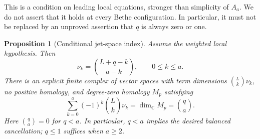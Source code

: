 \documentclass[11pt]{article}
\newtheorem{proposition}{Proposition}[section]
\theoremstyle{definition}
\newcommand{\C}{\mathbb C}
\begin{document}
This is a condition on leading local equations, stronger than simplicity
of $A_a$. We do not assert that it holds at every Bethe configuration.
In particular, it must not be replaced by an unproved assertion that
$q$ is always zero or one.

\begin{proposition}[Conditional jet-space index]\label{prop:jet-koszul-index}
Assume the weighted local hypothesis. Then
\begin{equation}\label{eq:jet-local-lengths}
 \nu_k=\binom{L+q-k}{a-k},\qquad 0\le k\le a.
\end{equation}
There is an explicit finite complex of vector spaces with term
dimensions $\binom Lk\nu_k$, no positive homology, and degree-zero
homology $M_p$ satisfying
\begin{equation}\label{eq:jet-koszul-index}
 \boxed{\sum_{k=0}^a(-1)^k\binom Lk\nu_k
       =\dim_\C M_p=\binom qa.}
\end{equation}
Here $\binom qa=0$ for $q<a$. In particular, $q<a$ implies the desired
balanced cancellation; $q\le1$ suffices when $a\ge2$.
\end{proposition}
\end{document}
